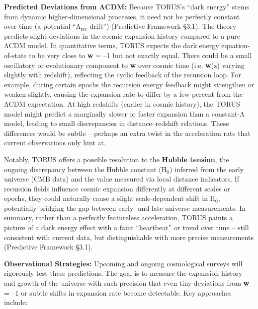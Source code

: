 \documentclass[]{article}
\newcommand{\subscript}[1]{\ensuremath{_{\mathrm{#1}}}}
\begin{document}
\textbf{Predicted Deviations from ΛCDM:} Because TORUS's ``dark energy''
stems from dynamic higher-dimensional processes, it need not be
perfectly constant over time (a potential
``Λ\subscript{rec} drift'')
(Predictive Framework §3.1). The theory predicts slight deviations in
the cosmic expansion history compared to a pure ΛCDM model. In
quantitative terms, TORUS expects the dark energy equation-of-state to
be very close to \textbf{w} = --1 but not exactly equal. There could be
a small oscillatory or evolutionary component to \textbf{w} over cosmic
time (i.e. \textbf{w}(z) varying slightly with redshift), reflecting the
cyclic feedback of the recursion loop. For example, during certain
epochs the recursion energy feedback might strengthen or weaken
slightly, causing the expansion rate to differ by a few percent from the
ΛCDM expectation. At high redshifts (earlier in cosmic history), the
TORUS model might predict a marginally slower or faster expansion than a
constant-Λ model, leading to small discrepancies in distance--redshift
relations. These differences would be subtle -- perhaps an extra twist
in the acceleration rate that current observations only hint at.

Notably, TORUS offers a possible resolution to the \textbf{Hubble
tension}, the ongoing discrepancy between the Hubble constant
(H\subscript{0}) inferred
from the early universe (CMB data) and the value measured via local
distance indicators. If recursion fields influence cosmic expansion
differently at different scales or epochs, they could naturally cause a
slight scale-dependent shift in
H\subscript{0}, potentially
bridging the gap between early- and late-universe measurements. In
summary, rather than a perfectly featureless acceleration, TORUS paints
a picture of a dark energy effect with a faint ``heartbeat'' or trend
over time -- still consistent with current data, but distinguishable
with more precise measurements (Predictive Framework §3.1).

\textbf{Observational Strategies:} Upcoming and ongoing cosmological
surveys will rigorously test these predictions. The goal is to measure
the expansion history and growth of the universe with such precision
that even tiny deviations from \textbf{w} = --1 or subtle shifts in
expansion rate become detectable. Key approaches include:
\end{document}
